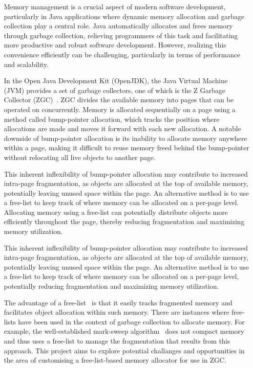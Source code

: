 
Memory management is a crucial aspect of modern software development, particularly in Java applications where dynamic memory allocation and garbage collection play a central role. Java automatically allocates and frees memory through garbage collection, relieving programmers of this task and facilitating more productive and robust software development. However, realizing this convenience efficiently can be challenging, particularly in terms of performance and scalability.

In the Open Java Development Kit (OpenJDK), the Java Virtual Machine (JVM) provides a set of garbage collectors, one of which is the Z Garbage Collector (ZGC)~\cite{zgc}. ZGC divides the available memory into pages that can be operated on concurrently. Memory is allocated sequentially on a page using a method called bump-pointer allocation, which tracks the position where allocations are made and moves it forward with each new allocation. A notable downside of bump-pointer allocation is its inability to allocate memory anywhere within a page, making it difficult to reuse memory freed behind the bump-pointer without relocating all live objects to another page.

This inherent inflexibility of bump-pointer allocation may contribute to increased intra-page fragmentation, as objects are allocated at the top of available memory, potentially leaving unused space within the page. An alternative method is to use a free-list to keep track of where memory can be allocated on a per-page level. Allocating memory using a free-list can potentially distribute objects more efficiently throughout the page, thereby reducing fragmentation and maximizing memory utilization.

This inherent inflexibility of bump-pointer allocation may contribute to increased intra-page fragmentation, as objects are allocated at the top of available memory, potentially leaving unused space within the page. An alternative method is to use a free-list to keep track of where memory can be allocated on a per-page level, potentially reducing fragmentation and maximizing memory utilization.

The advantage of a free-list~\cite{gchandbook} is that it easily tracks fragmented memory and facilitates object allocation within such memory. There are instances where free-lists have been used in the context of garbage collection to allocate memory. For example, the well-established mark-sweep algorithm~\cite{gchandbook} does not compact memory and thus uses a free-list to manage the fragmentation that results from this approach. This project aims to explore potential challanges and opportunities in the area of customising a free-list-based memory allocator for use in ZGC.


